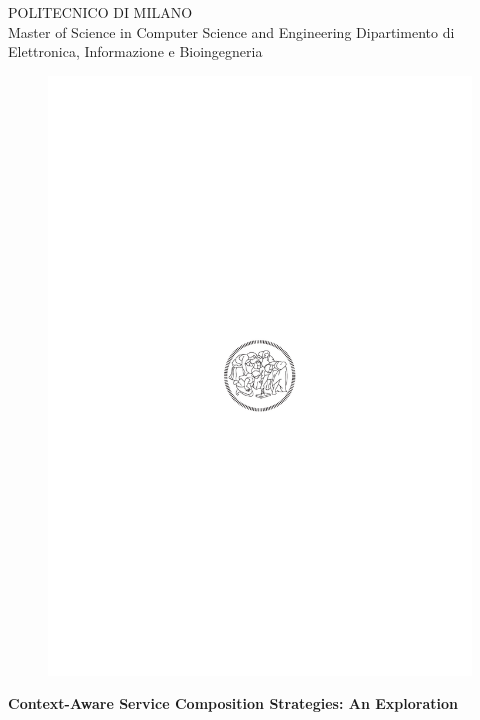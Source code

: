 \thispagestyle{empty}
\vspace*{-1.5cm} 

\bfseries{
\begin{center}

\large
POLITECNICO DI MILANO\\
\normalsize
Master of Science in Computer Science and Engineering
Dipartimento di Elettronica, Informazione e Bioingegneria
 
\vspace{10mm}

\begin{figure}[h]
\begin{center}
\includegraphics{logo_polimi.pdf}
\end{center}
\end{figure}

\vspace{1cm} 
\LARGE
\textbf{Context-Aware Service Composition Strategies: An Exploration}\\



\end{center}}
